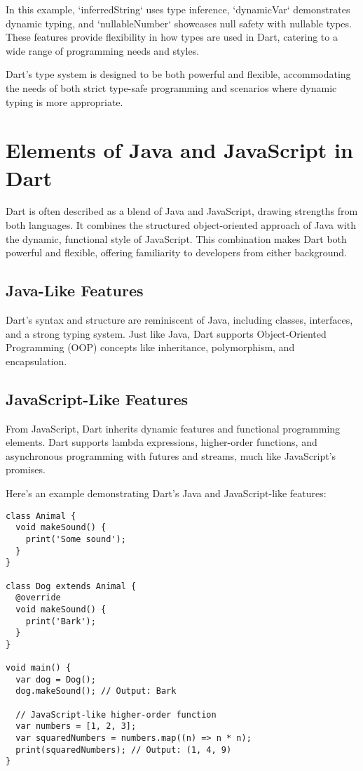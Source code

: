 \documentclass{book}
\begin{document}
In this example, `inferredString` uses type inference, `dynamicVar` demonstrates dynamic typing, and `nullableNumber` showcases null safety with nullable types. These features provide flexibility in how types are used in Dart, catering to a wide range of programming needs and styles.

Dart's type system is designed to be both powerful and flexible, accommodating the needs of both strict type-safe programming and scenarios where dynamic typing is more appropriate.

\chapter{Elements of Java and JavaScript in Dart}

Dart is often described as a blend of Java and JavaScript, drawing strengths from both languages. It combines the structured object-oriented approach of Java with the dynamic, functional style of JavaScript. This combination makes Dart both powerful and flexible, offering familiarity to developers from either background.

\section{Java-Like Features}
Dart's syntax and structure are reminiscent of Java, including classes, interfaces, and a strong typing system. Just like Java, Dart supports Object-Oriented Programming (OOP) concepts like inheritance, polymorphism, and encapsulation.

\section{JavaScript-Like Features}
From JavaScript, Dart inherits dynamic features and functional programming elements. Dart supports lambda expressions, higher-order functions, and asynchronous programming with futures and streams, much like JavaScript's promises.

Here's an example demonstrating Dart's Java and JavaScript-like features:

\begin{lstlisting}[style=dartstyle]
class Animal {
  void makeSound() {
    print('Some sound');
  }
}

class Dog extends Animal {
  @override
  void makeSound() {
    print('Bark');
  }
}

void main() {
  var dog = Dog();
  dog.makeSound(); // Output: Bark

  // JavaScript-like higher-order function
  var numbers = [1, 2, 3];
  var squaredNumbers = numbers.map((n) => n * n);
  print(squaredNumbers); // Output: (1, 4, 9)
}
\end{lstlisting}
\end{document}
